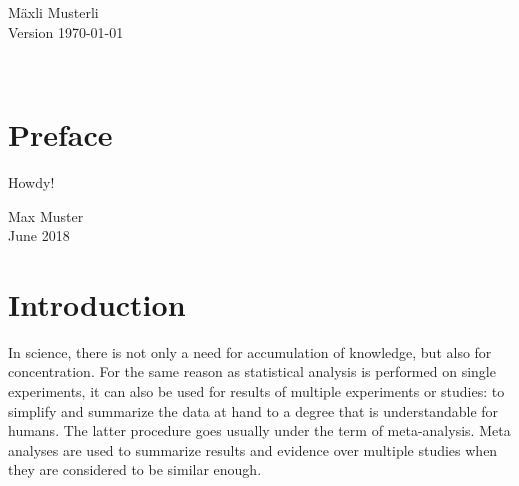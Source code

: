 \documentclass[11pt,a4paper,twoside]{book}\usepackage[]{graphicx}\usepackage[]{color}
\begin{document}





\graphicspath{{./figure/}}
\setcounter{tocdepth}{1}



\thispagestyle{empty}
\begin{center}
  \vspace*{6cm}{\bfseries\Huge
  $p$-values:\\[5mm] their use, abuse and proper use \\[5mm]
  illustrated with seven facets 
  }
  \vfill
  \rm

  \LARGE
  M\"axli Musterli\\[12mm]
  
  \normalsize
  Version \today
\end{center}
\newpage
\thispagestyle{empty}~
\newpage
{}

\thispagestyle{plain}
\tableofcontents
{}

\chapter*{Preface}
\thispagestyle{plain}

Howdy!

\bigskip

\begin{flushright}
  Max Muster\\
  June 2018
\end{flushright}


\cleardoublepage
{}







\chapter{Introduction}

In science, there is not only a need for accumulation of knowledge, but also for concentration. For the same reason as statistical analysis is performed on single experiments, it can also be used for results of multiple experiments or studies: to simplify and summarize the data at hand to a degree that is understandable for humans. The latter procedure goes usually under the term of meta-analysis. Meta analyses are used to summarize results and evidence over multiple studies when they are considered to be similar enough.
\end{document}
